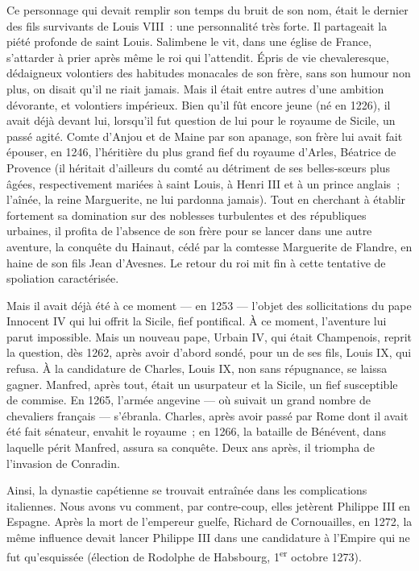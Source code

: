 \documentclass[french,twoside]{book} %
\begin{document}
Ce personnage qui devait remplir son temps du bruit de son nom, était le dernier des fils survivants de Louis VIII : une personnalité très forte. Il partageait la piété profonde de saint Louis. Salimbene le vit, dans une église de France, s’attarder à prier après même le roi qui l’attendit. Épris de vie chevaleresque, dédaigneux volontiers des habitudes monacales de son frère, sans son humour non plus, on disait qu’il ne riait jamais. Mais il était entre autres d’une ambition dévorante, et volontiers impérieux. Bien qu’il fût encore jeune (né en 1226), il avait déjà devant lui, lorsqu’il fut question de lui pour le royaume de Sicile, un passé agité. Comte d’Anjou et de Maine par son apanage, son frère lui avait fait épouser, en 1246, l’héritière du plus grand fief du royaume d’Arles, Béatrice de Provence (il héritait d’ailleurs du comté au détriment de ses belles-sœurs plus âgées, respectivement mariées à saint Louis, à Henri III et à un prince anglais ; l’aînée, la reine Marguerite, ne lui pardonna jamais). Tout en cherchant à établir fortement sa domination sur des noblesses turbulentes et des républiques urbaines, il profita de l’absence de son frère pour se lancer dans une autre aventure, la conquête du Hainaut, cédé par la comtesse Marguerite de Flandre, en haine de son fils Jean d’Avesnes. Le retour du roi mit fin à cette tentative de spoliation caractérisée.\par
Mais il avait déjà été à ce moment — en 1253 — l’objet des sollicitations du pape Innocent IV qui lui offrit la Sicile, fief pontifical. À ce moment, l’aventure lui parut impossible. Mais un nouveau pape, Urbain IV, qui était Champenois, reprit la question, dès 1262, après avoir d’abord sondé, pour un de ses fils, Louis IX, qui refusa. À la candidature de Charles, Louis IX, non sans répugnance, se laissa gagner. Manfred, après tout, était un usurpateur et la Sicile, un fief susceptible de commise. En 1265, l’armée angevine — où suivait un grand nombre de chevaliers français — s’ébranla. Charles, après avoir passé par Rome dont il avait été fait sénateur, envahit le royaume ; en 1266, la bataille de Bénévent, dans laquelle périt Manfred, assura sa conquête. Deux ans après, il triompha de l’invasion de Conradin.\par
Ainsi, la dynastie capétienne se trouvait entraînée dans les complications italiennes. Nous avons vu comment, par contre-coup, elles jetèrent Philippe III en Espagne. Après la mort de l’empereur guelfe, Richard de Cornouailles, en 1272, la même influence devait lancer Philippe III dans une candidature à l’Empire qui ne fut qu’esquissée (élection de Rodolphe de Habsbourg, 1\textsuperscript{er} octobre 1273).\par
\end{document}
